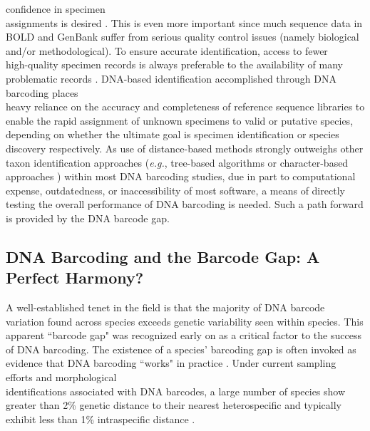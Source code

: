 confidence in specimen \\ assignments is desired \cite{doorenweerd2020highly, phillips2019incomplete, phillips2020hacsim, phillips2015exploration}. This is even more important since much sequence data in BOLD and GenBank suffer from serious quality control issues (namely biological and/or methodological). To ensure accurate identification, access to fewer \\ high-quality specimen records is always preferable to the availability of many problematic records \cite{collins2014known}. DNA-based identification accomplished through DNA barcoding places \\ heavy reliance on the accuracy and completeness of reference sequence libraries to enable the rapid assignment of unknown specimens to valid or putative species, depending on whether the ultimate goal is specimen identification or species discovery respectively.  As use of distance-based methods strongly outweighs other taxon identification approaches (\textit{e.g.}, tree-based algorithms \cite{barbera2019epang} or character-based approaches \cite{rach2008character, wong2009identifying}) within most DNA barcoding studies, due in part to computational expense, outdatedness, or inaccessibility of most software, a means of directly testing the overall performance of DNA barcoding is needed. Such a path forward is provided by the DNA barcode gap.  



\subsection{DNA Barcoding and the Barcode Gap: A Perfect Harmony?}

A well-established tenet in the field is that the majority of DNA barcode variation found across species exceeds genetic variability seen within species. This apparent ``barcode gap" \cite{meyer2005dna} was recognized early on as a critical factor to the success of DNA barcoding. The existence of a species' barcoding gap is often invoked as evidence that DNA barcoding ``works" in practice \cite{stoeckle2014dna}. Under current sampling efforts and morphological \\ identifications associated with DNA barcodes, a large number of species show greater than 2\% genetic distance to their nearest heterospecific and typically exhibit less than 1\% intraspecific distance \cite{hubert2015dna}. 



